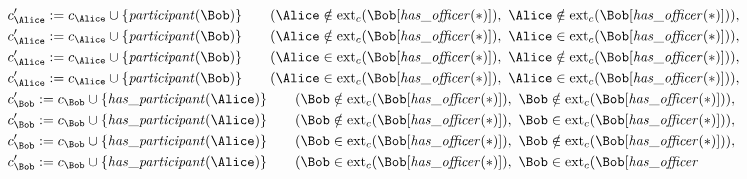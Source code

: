 \begin{align*}
&
c'_
{
\Alice
}
 := 
c_
{
\Alice
}
 \cup 
\{
\mathit{\detokenize{
participant
}}
(
\Bob
)
\}
 \qquad (
\Alice
 \notin 
\mathrm{ext}_c(
\Bob
[
\mathit{\detokenize{
has_officer
}}
(
\ast
)
]
)
,\ 
\Alice
 \notin 
\mathrm{ext}_c(
\Bob
[
\mathit{\detokenize{
has_officer
}}
(
\ast
)
]
)
)
,\\
&
c'_
{
\Alice
}
 := 
c_
{
\Alice
}
 \cup 
\{
\mathit{\detokenize{
participant
}}
(
\Bob
)
\}
 \qquad (
\Alice
 \notin 
\mathrm{ext}_c(
\Bob
[
\mathit{\detokenize{
has_officer
}}
(
\ast
)
]
)
,\ 
\Alice
 \in 
\mathrm{ext}_c(
\Bob
[
\mathit{\detokenize{
has_officer
}}
(
\ast
)
]
)
)
,\\
&
c'_
{
\Alice
}
 := 
c_
{
\Alice
}
 \cup 
\{
\mathit{\detokenize{
participant
}}
(
\Bob
)
\}
 \qquad (
\Alice
 \in 
\mathrm{ext}_c(
\Bob
[
\mathit{\detokenize{
has_officer
}}
(
\ast
)
]
)
,\ 
\Alice
 \notin 
\mathrm{ext}_c(
\Bob
[
\mathit{\detokenize{
has_officer
}}
(
\ast
)
]
)
)
,\\
&
c'_
{
\Alice
}
 := 
c_
{
\Alice
}
 \cup 
\{
\mathit{\detokenize{
participant
}}
(
\Bob
)
\}
 \qquad (
\Alice
 \in 
\mathrm{ext}_c(
\Bob
[
\mathit{\detokenize{
has_officer
}}
(
\ast
)
]
)
,\ 
\Alice
 \in 
\mathrm{ext}_c(
\Bob
[
\mathit{\detokenize{
has_officer
}}
(
\ast
)
]
)
)
,\\
&
c'_
{
\Bob
}
 := 
c_
{
\Bob
}
 \cup 
\{
\mathit{\detokenize{
has_participant
}}
(
\Alice
)
\}
 \qquad (
\Bob
 \notin 
\mathrm{ext}_c(
\Bob
[
\mathit{\detokenize{
has_officer
}}
(
\ast
)
]
)
,\ 
\Bob
 \notin 
\mathrm{ext}_c(
\Bob
[
\mathit{\detokenize{
has_officer
}}
(
\ast
)
]
)
)
,\\
&
c'_
{
\Bob
}
 := 
c_
{
\Bob
}
 \cup 
\{
\mathit{\detokenize{
has_participant
}}
(
\Alice
)
\}
 \qquad (
\Bob
 \notin 
\mathrm{ext}_c(
\Bob
[
\mathit{\detokenize{
has_officer
}}
(
\ast
)
]
)
,\ 
\Bob
 \in 
\mathrm{ext}_c(
\Bob
[
\mathit{\detokenize{
has_officer
}}
(
\ast
)
]
)
)
,\\
&
c'_
{
\Bob
}
 := 
c_
{
\Bob
}
 \cup 
\{
\mathit{\detokenize{
has_participant
}}
(
\Alice
)
\}
 \qquad (
\Bob
 \in 
\mathrm{ext}_c(
\Bob
[
\mathit{\detokenize{
has_officer
}}
(
\ast
)
]
)
,\ 
\Bob
 \notin 
\mathrm{ext}_c(
\Bob
[
\mathit{\detokenize{
has_officer
}}
(
\ast
)
]
)
)
,\\
&
c'_
{
\Bob
}
 := 
c_
{
\Bob
}
 \cup 
\{
\mathit{\detokenize{
has_participant
}}
(
\Alice
)
\}
 \qquad (
\Bob
 \in 
\mathrm{ext}_c(
\Bob
[
\mathit{\detokenize{
has_officer
}}
(
\ast
)
]
)
,\ 
\Bob
 \in 
\mathrm{ext}_c(
\Bob
[
\mathit{\detokenize{
has_officer
}}
\end{align*}

